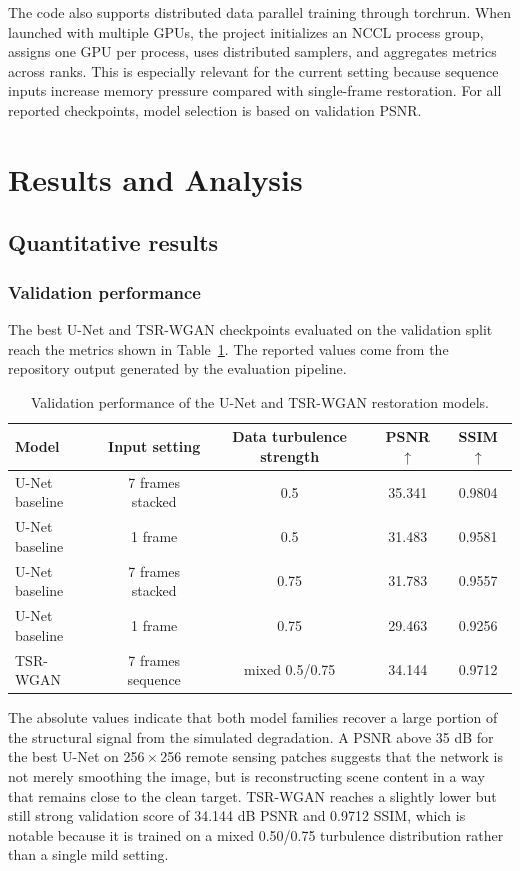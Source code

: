 \documentclass{article}
\begin{document}
The code also supports distributed data parallel training through torchrun. When launched with multiple GPUs, the project initializes an NCCL process group, assigns one GPU per process, uses distributed samplers, and aggregates metrics across ranks. This is especially relevant for the current setting because sequence inputs increase memory pressure compared with single-frame restoration. For all reported checkpoints, model selection is based on validation PSNR.

\section{Results and Analysis}
\subsection{Quantitative results}
\subsubsection{Validation performance}
The best U-Net and TSR-WGAN checkpoints evaluated on the validation split reach the metrics shown in Table~\ref{tab:quantitative}. The reported values come from the repository output generated by the evaluation pipeline.

\begin{table}[H]
    \centering
    \caption{Validation performance of the U-Net and TSR-WGAN restoration models.}
    \label{tab:quantitative}
    \begin{tabular}{lcccc}
        \toprule
        Model & Input setting & Data turbulence strength & PSNR $\uparrow$ & SSIM $\uparrow$ \\
        \midrule
        U-Net baseline & 7 frames stacked & 0.5 & 35.341 & 0.9804 \\
        U-Net baseline & 1 frame & 0.5 & 31.483 & 0.9581 \\
        U-Net baseline & 7 frames stacked & 0.75 & 31.783 & 0.9557 \\
        U-Net baseline & 1 frame & 0.75 & 29.463 & 0.9256 \\
        TSR-WGAN & 7 frames sequence & mixed 0.5/0.75 & 34.144 & 0.9712 \\
        \bottomrule
    \end{tabular}
\end{table}

The absolute values indicate that both model families recover a large portion of the structural signal from the simulated degradation. A PSNR above 35 dB for the best U-Net on 256\,$\times$\,256 remote sensing patches suggests that the network is not merely smoothing the image, but is reconstructing scene content in a way that remains close to the clean target. TSR-WGAN reaches a slightly lower but still strong validation score of 34.144 dB PSNR and 0.9712 SSIM, which is notable because it is trained on a mixed 0.50/0.75 turbulence distribution rather than a single mild setting.
\end{document}
